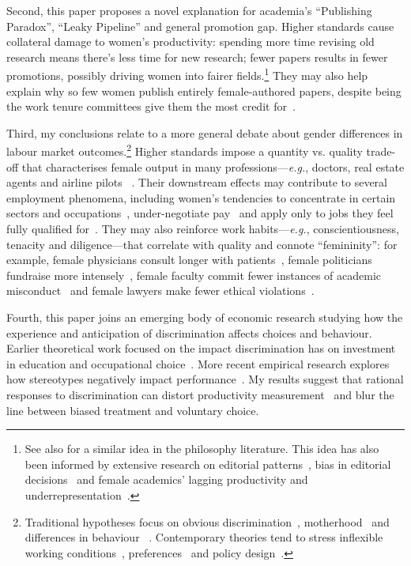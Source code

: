 Second, this paper proposes a novel explanation for academia's ``Publishing Paradox'', ``Leaky Pipe\-line'' and general promotion gap. Higher standards cause collateral damage to women's productivity: spending more time revising old research means there's less time for new research; fewer papers results in fewer promotions, possibly driving women into fairer fields.\footnote{See also \citet{Bright2017} for a similar idea in the philosophy literature. This idea has also been informed by extensive research on editorial patterns~\citep{Ellison2002a,Card2013,Clain2017,Casnici2016,Card2020}, bias in editorial decisions~\citep{Abrevaya2012,Card2017,Bransch2017,Card2020} and female academics' lagging productivity and underrepresentation~\citep{Ductor2018,Bayer2016,Ginther2004,Teele2017,Chari2017}.} They may also help explain why so few women publish entirely female-authored papers, despite being the work tenure committees give them the most credit for~\citep{Sarsons2020}.

Third, my conclusions relate to a more general debate about gender differences in labour market outcomes.\footnote{Traditional hypotheses focus on obvious discrimination~\citep{Goldin2000}, motherhood~\citep{Bertrand2010} and differences in behaviour ~\citep[\emph{e.g.},][]{Niederle2010}. Contemporary theories tend to stress inflexible working conditions~\citep{Goldin2014, Goldin2016}, preferences~\citep[for a review, see][]{Blau2016} and policy design~\citep{Antecol2016}.} Higher standards impose a quantity vs. quality trade-off that characterises female output in many professions---\emph{e.g.}, doctors, real estate agents and airline pilots ~\citep[for a discussion, see][]{Hengel2017}. Their downstream effects may contribute to several employment phenomena, including women's tendencies to concentrate in certain sectors and occupations~\citep{Blau2016,Cortes2016}, under-negotiate pay~\citep{Babcock2003} and apply only to jobs they feel fully qualified for~\citep{Mohr2014}. They may also reinforce work habits---\emph{e.g.}, conscientiousness, tenacity and diligence---that correlate with quality and connote ``femininity'': for example, female physicians consult longer with patients~\citep{Roter2004}, female politicians fundraise more intensely~\citep{Jenkins2007}, female faculty commit fewer instances of academic misconduct~\citep{Fang2013} and female lawyers make fewer ethical violations~\citep{Hatamyar2004}.

Fourth, this paper joins an emerging body of economic research studying how the experience and anticipation of discrimination affects choices and behaviour. Earlier theoretical work focused on the impact discrimination has on investment in education and occupational choice~\citep[see, \emph{e.g.},][]{Lundberg1983,Coate1993,Goldin2014a}. More recent empirical research explores how stereotypes negatively impact performance~\citep{Coffman2014,Bordalo2016,Lavy2015,Glover2017,Carlana2019}. My results suggest that rational responses to discrimination can distort productivity measurement~\citep[see also][]{Parsons2011} and blur the line between biased treatment and voluntary choice.


